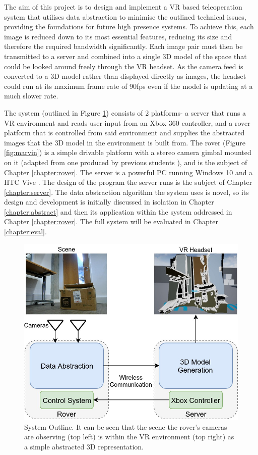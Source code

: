 The aim of this project is to design and implement a VR based teleoperation system that utilises data abstraction to minimise the outlined technical issues, providing the foundations for future high presence systems. To achieve this, each image is reduced down to its most essential features, reducing its size and therefore the required bandwidth significantly. Each image pair must then be transmitted to a server and combined into a single 3D model of the space that could be looked around freely through the VR headset. As the camera feed is converted to a 3D model rather than displayed directly as images, the headset could run at its maximum frame rate of 90fps even if the model is updating at a much slower rate.

The system (outlined in Figure \ref{fig:outline}) consists of 2 platforms- a server that runs a VR environment and reads user input from an Xbox 360 controller, and a rover platform that is controlled from said environment and supplies the abstracted images that the 3D model in the environment is built from. The rover (Figure \ref{fig:marvin}) is a simple drivable platform with a stereo camera gimbal mounted on it (adapted from one produced by previous students \cite{gimble}), and is the subject of Chapter \ref{chapter:rover}. The server is a powerful PC running Windows 10 \cite{windows} and a HTC Vive \cite{Vive}. The design of the program the server runs is the subject of Chapter \ref{chapter:server}. The data abstraction algorithm the system uses is novel, so its design and development is initially discussed in isolation in Chapter \ref{chapter:abstract} and then its application within the system addressed in Chapter \ref{chapter:rover}. The full system will be evaluated in Chapter \ref{chapter:eval}.

\begin{figure}[H]
    \begin{center}
      \includegraphics[width=1\textwidth]{Figures/Outline.jpg}
      \caption[System Outline]{System Outline. It can be seen that the scene the rover's cameras are observing (top left) is within the VR environment (top right) as a simple abstracted 3D representation.}
      \label{fig:outline}
    \end{center}
\end{figure}

